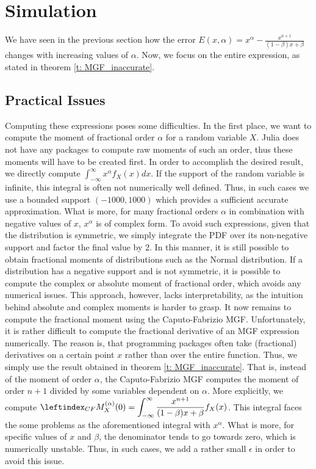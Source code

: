 \section{Simulation}\label{s:simulation}
We have seen in the previous section how the error \(E(x, \alpha) = x^\alpha - \displaystyle \frac{x^{n+1} }{(1 - \beta)x + \beta}\) changes with increasing values of \(\alpha\). Now, we focus on the entire expression, as stated in theorem \ref{t: MGF_inaccurate}.
\subsection{Practical Issues}
Computing these expressions poses some difficulties. In the first place, we want to compute the moment of fractional order \(\alpha\) for a random variable \(X\). Julia does not have any packages to compute raw moments of such an order, thus these moments will have to be created first. In order to accomplish the desired result, we directly compute \(\int_{-\infty}^{\infty} x^\alpha  f_X(x) dx\). If the support of the random variable is infinite, this integral is often not numerically well defined. Thus, in such cases we use a bounded support \((-1000, 1000)\) which provides a sufficient accurate approximation. What is more, for many fractional orders \(\alpha\) in combination with negative values of \(x\), \(x^\alpha\) is of complex form. To avoid such expressions, given that the distribution is symmetric, we simply integrate the PDF over its non-negative support and factor the final value by 2. In this manner, it is still possible to obtain fractional moments of distributions such as the Normal distribution. If a distribution has a negative support and is not symmetric, it is possible to compute the complex or absolute moment of fractional order, which avoids any numerical issues. This approach, however, lacks interpretability, as the intuition behind absolute and complex moments is harder to grasp. 
\newline
It now remains to compute the fractional moment using the Caputo-Fabrizio MGF. Unfortunately, it is rather difficult to compute the fractional derivative of an MGF expression numerically. The reason is, that programming packages often take (fractional) derivatives on a certain point \(x\) rather than over the entire function. Thus, we simply use the result obtained in theorem \ref{t: MGF_inaccurate}. That is, instead of the moment of order \(\alpha\), the Caputo-Fabrizio MGF computes the moment of order \(n+1\) divided by some variables dependent on \(\alpha\). More explicitly, we compute \(\leftindex_{CF}{M}_X^{(\alpha)}(0) = \displaystyle \int_{-\infty}^{\infty}  \frac{x^{n+1} }{(1 - \beta)x + \beta} f_X(x)\). This integral faces the some problems as the aforementioned integral with \(x^\alpha\). What is more, for specific values of \(x\) and \(\beta\), the denominator tends to go towards zero, which is numerically unstable. Thus, in such cases, we add a rather small \(\epsilon\) in order to avoid this issue.

